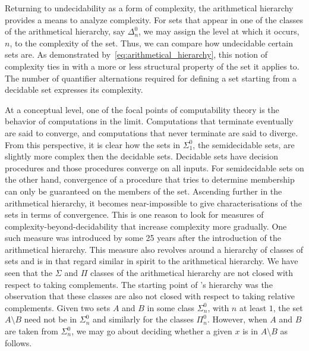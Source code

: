 Returning to undecidability as a form of complexity, the arithmetical hierarchy provides a means to analyze complexity.
For sets that appear in one of the classes of the arithmetical hierarchy, say $\Delta^0_n$, we may assign the level at which it occurs, $n$, to the complexity of the set.
Thus, we can compare how undecidable certain sets are.
As demonstrated by~\eqref{eq:arithmetical_hierarchy}, this notion of complexity ties in with a more or less structural property of the set it applies to.
The number of quantifier alternations required for defining a set starting from a decidable set expresses its complexity.

At a conceptual level, one of the focal points of computability theory is the behavior of computations in the limit.
Computations that terminate eventually are said to converge, and computations that never terminate are said to diverge.
From this perspective, it is clear how the sets in $\Sigma^0_1$, the semidecidable sets, are slightly more complex then the decidable sets.
Decidable sets have decision procedures and those procedures converge on all inputs.
For semidecidable sets on the other hand, convergence of a procedure that tries to determine membership can only be guaranteed on the members of the set.
Ascending further in the arithmetical hierarchy, it becomes near-impossible to give characterisations of the sets in terms of convergence.
This is one reason to look for measures of complexity-beyond-decidability that increase complexity more gradually.
One such measure was introduced by \textcite{ershov1968hierarchyi} some 25 years after the introduction of the arithmetical hierarchy.
This measure also revolves around a hierarchy of classes of sets and is in that regard similar in spirit to the arithmetical hierarchy.
We have seen that the $\Sigma$ and $\Pi$ classes of the arithmetical hierarchy are not closed with respect to taking complements.
The starting point of \citeauthor{ershov1968hierarchyi}'s hierarchy was the observation that these classes are also not closed with respect to taking relative complements.
Given two sets $A$ and $B$ in some class $\Sigma^0_n$, with $n$ at least $1$, the set $A \setminus B$ need not be in $\Sigma^0_n$ and similarly for the classes $\Pi^0_n$.
However, when $A$ and $B$ are taken from $\Sigma^0_n$, we may go about deciding whether a given $x$ is in $A \setminus B$ as follows.
